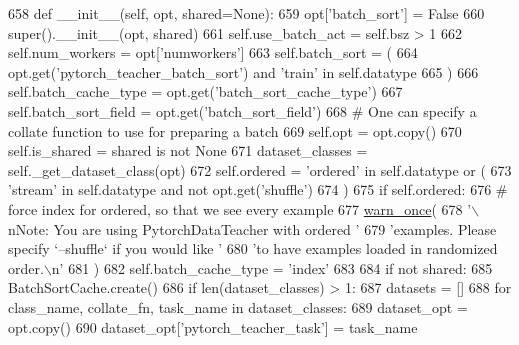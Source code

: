 \begin{DoxyCode}
658     \textcolor{keyword}{def }\_\_init\_\_(self, opt, shared=None):
659         opt[\textcolor{stringliteral}{'batch\_sort'}] = \textcolor{keyword}{False}
660         super().\_\_init\_\_(opt, shared)
661         self.use\_batch\_act = self.bsz > 1
662         self.num\_workers = opt[\textcolor{stringliteral}{'numworkers'}]
663         self.batch\_sort = (
664             opt.get(\textcolor{stringliteral}{'pytorch\_teacher\_batch\_sort'}) \textcolor{keywordflow}{and} \textcolor{stringliteral}{'train'} \textcolor{keywordflow}{in} self.datatype
665         )
666         self.batch\_cache\_type = opt.get(\textcolor{stringliteral}{'batch\_sort\_cache\_type'})
667         self.batch\_sort\_field = opt.get(\textcolor{stringliteral}{'batch\_sort\_field'})
668         \textcolor{comment}{# One can specify a collate function to use for preparing a batch}
669         self.opt = opt.copy()
670         self.is\_shared = shared \textcolor{keywordflow}{is} \textcolor{keywordflow}{not} \textcolor{keywordtype}{None}
671         dataset\_classes = self.\_get\_dataset\_class(opt)
672         self.ordered = \textcolor{stringliteral}{'ordered'} \textcolor{keywordflow}{in} self.datatype \textcolor{keywordflow}{or} (
673             \textcolor{stringliteral}{'stream'} \textcolor{keywordflow}{in} self.datatype \textcolor{keywordflow}{and} \textcolor{keywordflow}{not} opt.get(\textcolor{stringliteral}{'shuffle'})
674         )
675         \textcolor{keywordflow}{if} self.ordered:
676             \textcolor{comment}{# force index for ordered, so that we see every example}
677             \hyperlink{namespaceparlai_1_1utils_1_1misc_acf146e70ea7f6867969a7c2b545d4b4b}{warn\_once}(
678                 \textcolor{stringliteral}{'\(\backslash\)nNote: You are using PytorchDataTeacher with ordered '}
679                 \textcolor{stringliteral}{'examples. Please specify `--shuffle` if you would like '}
680                 \textcolor{stringliteral}{'to have examples loaded in randomized order.\(\backslash\)n'}
681             )
682             self.batch\_cache\_type = \textcolor{stringliteral}{'index'}
683 
684         \textcolor{keywordflow}{if} \textcolor{keywordflow}{not} shared:
685             BatchSortCache.create()
686             \textcolor{keywordflow}{if} len(dataset\_classes) > 1:
687                 datasets = []
688                 \textcolor{keywordflow}{for} class\_name, collate\_fn, task\_name \textcolor{keywordflow}{in} dataset\_classes:
689                     dataset\_opt = opt.copy()
690                     dataset\_opt[\textcolor{stringliteral}{'pytorch\_teacher\_task'}] = task\_name

\end{DoxyCode}
